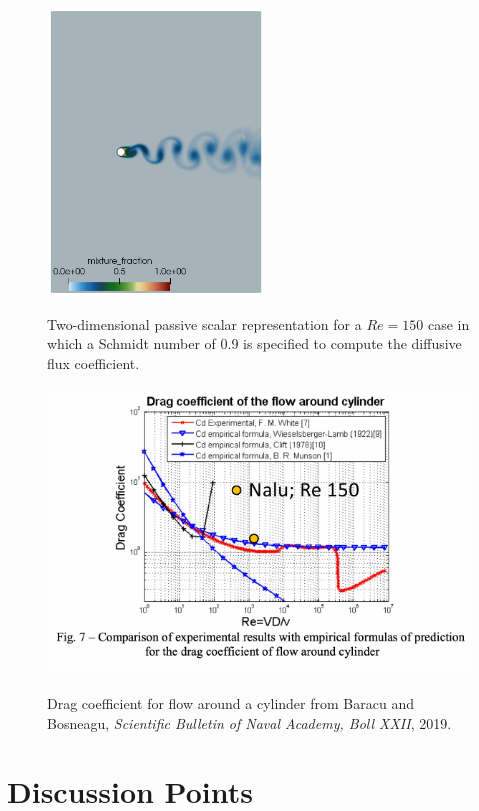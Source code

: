 \documentclass{article}
\begin{document}
\begin{figure}[!htbp]
  \centering
  {
   \includegraphics[height=3.0in]{images/vortexStreetR0.png}
  }
  \caption{Two-dimensional passive scalar representation for a $Re = 150$ case in which a Schmidt number of 0.9 is specified to
compute the diffusive flux coefficient.}
  \label{fig:passive_scalar}
\end{figure}

\begin{figure}[!htbp]
  \centering
  {
   \includegraphics[height=3.0in]{images/cylinder_drag-crop.pdf}
  }
  \caption{Drag coefficient for flow around a cylinder from Baracu and Bosneagu, {\em Scientific Bulletin of Naval Academy, Boll XXII}, 2019.}
  \label{fig:drag_re}
\end{figure}

\section{Discussion Points}
\end{document}
